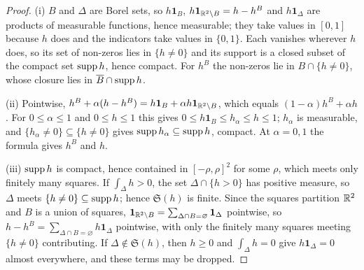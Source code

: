 \begin{proof}
(i) $B$ and $\Delta$ are Borel sets, so $h\mathbf 1_B$, $h\mathbf 1_{\mathbb{R}^2\setminus B}=h-h^B$
and $h\mathbf 1_\Delta$ are products of measurable functions, hence measurable; they take
values in $[0,1]$ because $h$ does and the indicators take values in $\{0,1\}$.  Each
vanishes wherever $h$ does, so its set of non-zeros lies in $\{h\ne0\}$ and its support is
a closed subset of the compact set $\operatorname{supp} h$, hence compact.  For $h^B$ the non-zeros lie in
$B\cap\{h\ne0\}$, whose closure lies in $\overline B\cap\operatorname{supp} h$.

(ii) Pointwise, $h^B+\alpha(h-h^B)=h\mathbf 1_B+\alpha h\mathbf 1_{\mathbb{R}^2\setminus B}$, which
equals $(1-\alpha)h^B+\alpha h$.  For $0\le\alpha\le1$ and $0\le h\le1$ this gives $0\le
h\mathbf 1_B\le h_\alpha\le h\le1$; $h_\alpha$ is measurable, and $\{h_\alpha\ne0\}\subseteq
\{h\ne0\}$ gives $\operatorname{supp} h_\alpha\subseteq\operatorname{supp} h$, compact.  At $\alpha=0,1$ the formula
gives $h^B$ and $h$.

(iii) $\operatorname{supp} h$ is compact, hence contained in $[-\rho,\rho]^2$ for some $\rho$, which meets
only finitely many squares.  If $\int_\Delta h>0$, the set $\Delta\cap\{h>0\}$ has positive
measure, so $\Delta$ meets $\{h\ne0\}\subseteq\operatorname{supp} h$; hence $\mathfrak S(h)$ is finite.
Since the squares partition $\mathbb{R}^2$ and $B$ is a union of squares, $\mathbf 1_{\mathbb{R}^2\setminus
B}=\sum_{\Delta\cap B=\varnothing}\mathbf 1_\Delta$ pointwise, so $h-h^B=\sum_{\Delta\cap
B=\varnothing}h\mathbf 1_\Delta$ pointwise, with only the finitely many squares meeting
$\{h\ne0\}$ contributing.  If $\Delta\notin\mathfrak S(h)$, then $h\ge0$ and $\int_\Delta
h=0$ give $h\mathbf 1_\Delta=0$ almost everywhere, and these terms may be dropped.


\end{proof}
